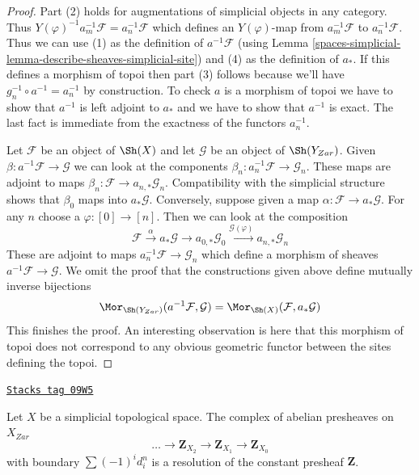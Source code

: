 \begin{proof}
Part (2) holds for augmentations of simplicial objects in any category.
Thus $Y(\varphi)^{-1} a_m^{-1} \mathcal{F} = a_n^{-1}\mathcal{F}$
which defines an $Y(\varphi)$-map from $a_m^{-1}\mathcal{F}$
to $a_n^{-1}\mathcal{F}$.
Thus we can use (1) as the definition of $a^{-1}\mathcal{F}$ (using
Lemma \ref{spaces-simplicial-lemma-describe-sheaves-simplicial-site}) and
(4) as the definition of $a_*$. If this defines a morphism of topoi
then part (3) follows because we'll have $g_n^{-1} \circ a^{-1} = a_n^{-1}$
by construction. To check $a$ is a morphism of topoi we have to show
that $a^{-1}$ is left adjoint to $a_*$ and we have to show that
$a^{-1}$ is exact. The last fact is immediate from the exactness of
the functors $a_n^{-1}$.

\medskip\noindent
Let $\mathcal{F}$ be an object of $\Sh(X)$ and let $\mathcal{G}$
be an object of $\Sh(Y_{Zar})$. Given
$\beta : a^{-1}\mathcal{F} \to \mathcal{G}$ we can look at the
components $\beta_n : a_n^{-1}\mathcal{F} \to \mathcal{G}_n$.
These maps are adjoint to maps
$\beta_n : \mathcal{F} \to a_{n, *}\mathcal{G}_n$.
Compatibility with the simplicial structure shows that
$\beta_0$ maps into $a_*\mathcal{G}$.
Conversely, suppose given a map $\alpha : \mathcal{F} \to a_*\mathcal{G}$.
For any $n$ choose a $\varphi : [0] \to [n]$. Then we can look at
the composition
$$
\mathcal{F} \xrightarrow{\alpha} a_*\mathcal{G}
\to a_{0, *}\mathcal{G}_0 \xrightarrow{\mathcal{G}(\varphi)}
a_{n, *}\mathcal{G}_n
$$
These are adjoint to maps $a_n^{-1}\mathcal{F} \to \mathcal{G}_n$
which define a morphism of sheaves $a^{-1}\mathcal{F} \to \mathcal{G}$.
We omit the proof that the constructions given above define
mutually inverse bijections
$$
\Mor_{\Sh(Y_{Zar})}(a^{-1}\mathcal{F}, \mathcal{G}) =
\Mor_{\Sh(X)}(\mathcal{F}, a_*\mathcal{G})
$$
This finishes the proof. An interesting observation is here that
this morphism of topoi does not correspond to any obvious geometric
functor between the sites defining the topoi.
\end{proof}

\begin{lemma}
\label{spaces-simplicial-lemma-simplicial-resolution-Z}
\href{https://stacks.math.columbia.edu/tag/09W5}{\texttt{Stacks tag 09W5}}

Let $X$ be a simplicial topological space. The complex of
abelian presheaves on $X_{Zar}$
$$
\ldots \to \mathbf{Z}_{X_2} \to \mathbf{Z}_{X_1} \to \mathbf{Z}_{X_0}
$$
with boundary $\sum (-1)^i d^n_i$ is a resolution
of the constant presheaf $\mathbf{Z}$.
\end{lemma}

